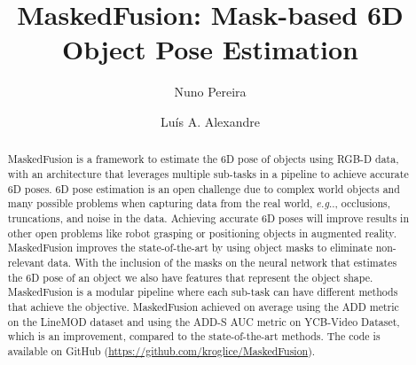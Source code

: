 \documentclass[runningheads]{llncs}
\makeatletter
\DeclareRobustCommand\onedot{\futurelet\@let@token\@onedot}
\def\@onedot{\ifx\@let@token.\else.\null\fi\xspace}
\def\eg{\emph{e.g}\onedot} \def\Eg{\emph{E.g}\onedot}
\makeatother
\begin{document}
\pagestyle{headings}
\mainmatter

\title{MaskedFusion: Mask-based 6D Object Pose Estimation} 


\author{Nuno Pereira  \and
Luís A. Alexandre  }
\maketitle


\begin{abstract}
    MaskedFusion is a framework to estimate the 6D pose of objects using RGB-D data, with an architecture that leverages multiple sub-tasks in a pipeline to achieve accurate 6D poses.
    6D pose estimation is an open challenge due to complex world objects and many possible problems when capturing data from the real world, \eg, occlusions, truncations, and noise in the data.
    Achieving accurate 6D poses will improve results in other open problems like robot grasping or positioning objects in augmented reality.
    MaskedFusion improves the state-of-the-art by using object masks to eliminate non-relevant data.
    With the inclusion of the masks on the neural network that estimates the 6D pose of an object we also have features that represent the object shape.
    MaskedFusion is a modular pipeline where each sub-task can have different methods that achieve the objective.
    MaskedFusion achieved  on average using the ADD metric on the LineMOD dataset and  using the ADD-S AUC metric on YCB-Video Dataset, which is an improvement, compared to the state-of-the-art methods. The code is available on GitHub (\url{https://github.com/kroglice/MaskedFusion}).

\end{abstract}
\end{document}
